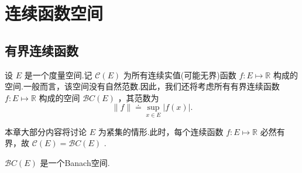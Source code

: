\chapter{连续函数空间}

\vspace{-2 em}
\section{有界连续函数}

设 $E$ 是一个度量空间.记 $\mathcal{C}\left( E\right)$ 为所有连续实值(可能无界)函数 $f : E \mapsto  \mathbb{R}$ 构成的空间.一般而言，该空间没有自然范数.因此，我们还将考虑所有有界连续函数 $f : E \mapsto  \mathbb{R}$ 构成的空间 $\mathcal{B}C\left( E\right)$ ，其范数为
\begin{equation}\tag{3.1}\label{eq:bc-norm}
\| f\|  \doteq  \mathop{\sup }\limits_{{x \in  E}}\left| {f\left( x\right) }\right| .
\end{equation}


本章大部分内容将讨论 $E$ 为紧集的情形.此时，每个连续函数 $f : E \mapsto  \mathbb{R}$ 必然有界，故 $\mathcal{C}\left( E\right)  = \mathcal{B}C\left( E\right)$ .

\begin{lemma}\label{lem:bc-banach}
$\mathcal{B}C\left( E\right)$ 是一个Banach空间.
\end{lemma}

